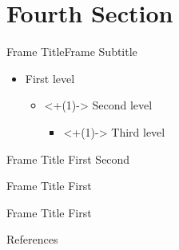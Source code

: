\documentclass[169,9pt]{beamer}
\begin{document}
\section{Fourth Section}\sectionFrame

\begin{frame}{Frame Title}{Frame Subtitle}
    \begin{itemize}
        \item First level
              \begin{itemize}
                  \item<+(1)-> Second level
                      \begin{itemize}
                          \item<+(1)-> Third level
                      \end{itemize}
              \end{itemize}
    \end{itemize}
\end{frame}

\begin{frame}{Frame Title}
    First
    \pause
    Second
\end{frame}


\begin{frame}{Frame Title}
    First
\end{frame}


\begin{frame}{Frame Title}
    First
\end{frame}

\begin{frame}[allowframebreaks]{References}
    
\end{frame}

\appendix

\end{document}
